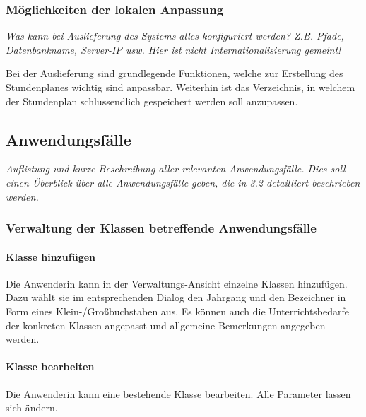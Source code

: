 \documentclass[fontsize=12pt,paper=a4,twoside]{scrartcl}
\begin{document}
\subsubsection{Möglichkeiten der lokalen Anpassung}


  {\em Was kann bei Auslieferung des Systems alles konfiguriert
  werden? Z.B. Pfade, Datenbankname, Server-IP usw. Hier ist nicht
  Internationalisierung gemeint!}

Bei der Auslieferung sind grundlegende Funktionen, welche zur Erstellung des Stundenplanes wichtig sind anpassbar.
Weiterhin ist das Verzeichnis, in welchem der Stundenplan schlussendlich gespeichert werden soll anzupassen.


\subsection{Anwendungsfälle}
  {\em Auflistung und kurze Beschreibung aller relevanten
  Anwendungsfälle. Dies soll einen Überblick über alle Anwendungsfälle
  geben, die in 3.2 detailliert beschrieben werden.}
  
\subsubsection{Verwaltung der Klassen betreffende Anwendungsfälle}


\paragraph{Klasse hinzufügen} Die Anwenderin kann in der Verwaltungs-Ansicht einzelne Klassen hinzufügen. Dazu wählt sie im entsprechenden Dialog den Jahrgang und den Bezeichner in Form eines Klein-/Großbuchstaben aus. Es können auch die Unterrichtsbedarfe der konkreten Klassen angepasst und allgemeine Bemerkungen angegeben werden.

\paragraph{Klasse bearbeiten} Die Anwenderin kann eine bestehende Klasse bearbeiten. Alle Parameter lassen sich ändern.
\end{document}
